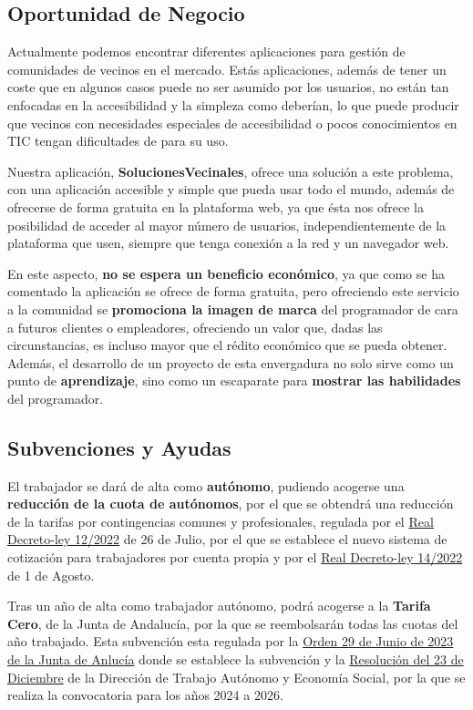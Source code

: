 \subsection{Oportunidad de Negocio}
Actualmente podemos encontrar diferentes aplicaciones para gestión de comunidades de vecinos en el mercado. Estás aplicaciones, además de tener un coste que en algunos casos puede no ser asumido por los usuarios, no están tan enfocadas en la accesibilidad y la simpleza como deberían, lo que puede producir que vecinos con necesidades especiales de accesibilidad o pocos conocimientos en TIC tengan dificultades de para su uso.

Nuestra aplicación, \textbf{SolucionesVecinales}, ofrece una solución a este problema, con una aplicación accesible y simple que pueda usar todo el mundo, además de ofrecerse de forma gratuita en la plataforma web, ya que ésta nos ofrece la posibilidad de acceder al mayor número de usuarios, independientemente de la plataforma que usen, siempre que tenga conexión a la red y un navegador web.

En este aspecto, \textbf{no se espera un beneficio económico}, ya que como se ha comentado la aplicación se ofrece de forma gratuita, pero ofreciendo este servicio a la comunidad se \textbf{promociona la imagen de marca} del programador de cara a futuros clientes o empleadores, ofreciendo un valor que, dadas las circunstancias, es incluso mayor que el rédito económico que se pueda obtener. Además, el desarrollo de un proyecto de esta envergadura no solo sirve como un punto de \textbf{aprendizaje}, sino como un escaparate para \textbf{mostrar las habilidades} del programador.

\subsection{Subvenciones y Ayudas}
El trabajador se dará de alta como \textbf{autónomo}, pudiendo acogerse una \textbf{reducción de la cuota de autónomos}, por el que se obtendrá una reducción de la tarifas por contingencias comunes y profesionales, regulada por el \href{https://www.boe.es/eli/es/rdl/2022/07/26/13/con}{Real Decreto-ley 12/2022} de 26 de Julio, por el que se establece el nuevo sistema de cotización para trabajadores por cuenta propia y por el \href{https://www.boe.es/eli/es/rdl/2022/08/01/14/con}{Real Decreto-ley 14/2022} de 1 de Agosto.

Tras un año de alta como trabajador autónomo, podrá acogerse a la \textbf{Tarifa Cero}, de la Junta de Andalucía, por la  que se reembolsarán todas las cuotas del año trabajado. Esta subvención esta regulada por la \href{https://www.juntadeandalucia.es/boja/2023/125/1}{Orden 29 de Junio de 2023 de la Junta de Anlucía} donde se establece la subvención y la \href{https://www.juntadeandalucia.es/boja/2023/248/4}{Resolución del 23 de Diciembre} de la Dirección de Trabajo Autónomo y Economía Social, por la que se realiza la convocatoria para los años 2024 a 2026.

